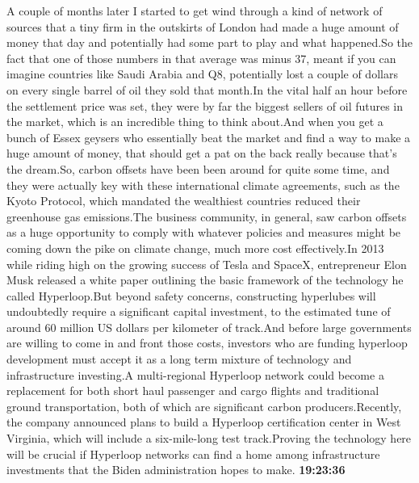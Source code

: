 \documentclass{article}%
\begin{document}
A couple of months later I started to get wind through a kind of network of sources that a tiny firm in the outskirts of London had made a huge amount of money that day and potentially had some part to play and what happened.So the fact that one of those numbers in that average was minus 37, meant if you can imagine countries like Saudi Arabia and Q8, potentially lost a couple of dollars on every single barrel of oil they sold that month.In the vital half an hour before the settlement price was set, they were by far the biggest sellers of oil futures in the market, which is an incredible thing to think about.And when you get a bunch of Essex geysers who essentially beat the market and find a way to make a huge amount of money, that should get a pat on the back really because that's the dream.So, carbon offsets have been been around for quite some time, and they were actually key with these international climate agreements, such as the Kyoto Protocol, which mandated the wealthiest countries reduced their greenhouse gas emissions.The business community, in general, saw carbon offsets as a huge opportunity to comply with whatever policies and measures might be coming down the pike on climate change, much more cost effectively.In 2013 while riding high on the growing success of Tesla and SpaceX, entrepreneur Elon Musk released a white paper outlining the basic framework of the technology he called Hyperloop.But beyond safety concerns, constructing hyperlubes will undoubtedly require a significant capital investment, to the estimated tune of around 60 million US dollars per kilometer of track.And before large governments are willing to come in and front those costs, investors who are funding hyperloop development must accept it as a long term mixture of technology and infrastructure investing.A multi{-}regional Hyperloop network could become a replacement for both short haul passenger and cargo flights and traditional ground transportation, both of which are significant carbon producers.Recently, the company announced plans to build a Hyperloop certification center in West Virginia, which will include a six{-}mile{-}long test track.Proving the technology here will be crucial if Hyperloop networks can find a home among infrastructure investments that the Biden administration hopes to make.%
\textbf{19:23:36}%
\newline%
\end{document}
